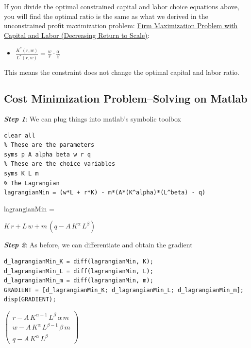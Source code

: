 \documentclass[
]{book}
\providecommand{\tightlist}{%
  \setlength{\itemsep}{0pt}\setlength{\parskip}{0pt}}
\begin{document}
If you divide the optimal constrained capital and labor choice equations
above, you will find the optimal ratio is the same as what we derived in
the unconstrained profit maximization problem: \href{https://math4econ.github.io/matrix_application/KL_borrowhire_firm.html}{Firm Maximization
Problem with Capital and Labor (Decreasing Return to
Scale)}:

\begin{itemize}
\tightlist
\item
  \(\displaystyle \frac{K^* (r,w)}{L^* (r,w)}=\frac{w}{r}\cdot \frac{\alpha }{\beta }\)
\end{itemize}

This means the constraint does not change the optimal capital and labor
ratio.

\hypertarget{cost-minimization-problemsolving-on-matlab}{%
\subsection{Cost Minimization Problem--Solving on Matlab}\label{cost-minimization-problemsolving-on-matlab}}

\textbf{\emph{Step 1}}: We can plug things into matlab's symbolic toolbox

\begin{verbatim}
clear all
% These are the parameters
syms p A alpha beta w r q
% These are the choice variables
syms K L m
% The Lagrangian
lagrangianMin = (w*L + r*K) - m*(A*(K^alpha)*(L^beta) - q)
\end{verbatim}

lagrangianMin =

\(\displaystyle K\,r+L\,w+m\,{\left(q-A\,K^{\alpha } \,L^{\beta } \right)}\)

\textbf{\emph{Step 2}}: As before, we can differentiate and obtain the gradient

\begin{verbatim}
d_lagrangianMin_K = diff(lagrangianMin, K);
d_lagrangianMin_L = diff(lagrangianMin, L);
d_lagrangianMin_m = diff(lagrangianMin, m);  
GRADIENT = [d_lagrangianMin_K; d_lagrangianMin_L; d_lagrangianMin_m];
disp(GRADIENT);
\end{verbatim}

\(\displaystyle \left(\begin{array}{c} r-A\,K^{\alpha -1} \,L^{\beta } \,\alpha \,m\\ w-A\,K^{\alpha } \,L^{\beta -1} \,\beta \,m\\ q-A\,K^{\alpha } \,L^{\beta } \end{array}\right)\)
\end{document}

